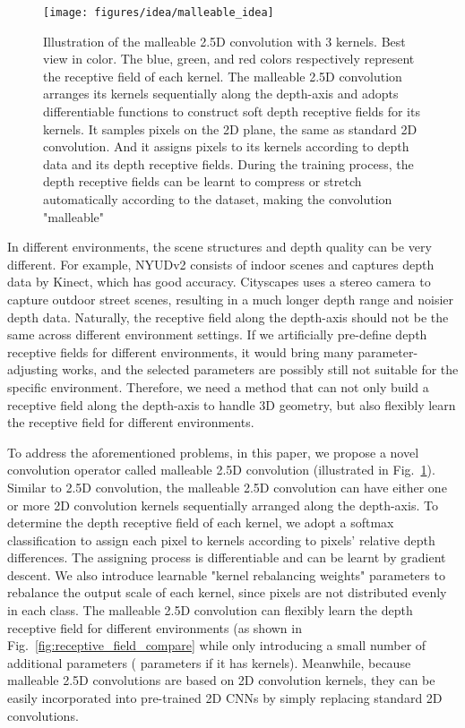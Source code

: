 \documentclass[runningheads]{llncs}
\begin{document}
\begin{figure}[tbp]
  \centering
  \texttt{[image: figures/idea/malleable\_idea]}
  \caption{
  Illustration of the malleable 2.5D convolution with 3 kernels.
  Best view in color.
  The blue, green, and red colors respectively represent the receptive field of each kernel.
  The malleable 2.5D convolution arranges its kernels sequentially along the depth-axis and adopts differentiable functions to construct soft depth receptive fields for its kernels.
  It samples pixels on the 2D plane, the same as standard 2D convolution.
  And it assigns pixels to its kernels according to depth data and its depth receptive fields.
  During the training process, the depth receptive fields can be learnt to compress or stretch automatically according to the dataset, making the convolution "malleable"
  }
  \label{fig:idea_illustration}
\end{figure}

In different environments, the scene structures and depth quality can be very different.
For example, NYUDv2\cite{NYUDv2} consists of indoor scenes and captures depth data by Kinect, which has good accuracy.
Cityscapes\cite{Cityscapes} uses a stereo camera to capture outdoor street scenes, resulting in a much longer depth range and noisier depth data.
Naturally, the receptive field along the depth-axis should not be the same across different environment settings.
If we artificially pre-define depth receptive fields for different environments, it would bring many parameter-adjusting works, and the selected parameters are possibly still not suitable for the specific environment.
Therefore, we need a method that can not only build a receptive field along the depth-axis to handle 3D geometry, but also flexibly learn the receptive field for different environments.

To address the aforementioned problems, in this paper, we propose a novel convolution operator called malleable 2.5D convolution (illustrated in Fig.~\ref{fig:idea_illustration}).
Similar to 2.5D convolution, the malleable 2.5D convolution can have either one or more 2D convolution kernels sequentially arranged along the depth-axis.
To determine the depth receptive field of each kernel, we adopt a softmax classification to assign each pixel to kernels according to pixels' relative depth differences.
The assigning process is differentiable and can be learnt by gradient descent.
We also introduce learnable "kernel rebalancing weights" parameters to rebalance the output scale of each kernel, since pixels are not distributed evenly in each class.
The malleable 2.5D convolution can flexibly learn the depth receptive field for different environments (as shown in Fig.~\ref{fig:receptive_field_compare} while only introducing a small number of additional parameters ( parameters if it has  kernels).
Meanwhile, because malleable 2.5D convolutions are based on 2D convolution kernels, they can be easily incorporated into pre-trained 2D CNNs by simply replacing standard 2D convolutions.
\end{document}
